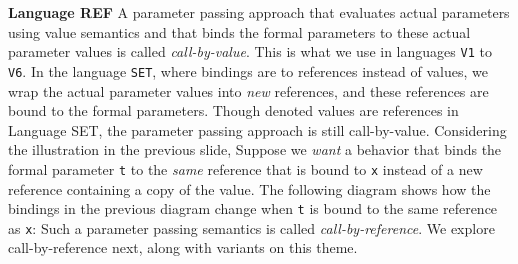 \begin{minipage}[t]{\sw}
\slidenumber
\LARGE
{\bf Language REF}\exx
A parameter passing approach
that evaluates actual parameters using value semantics
and that binds the formal parameters
to these actual parameter values
is called {\em call-by-value}.
This is what we use in languages \verb'V1' to \verb'V6'.\exx
In the language \verb'SET',
where bindings are to references instead of values,
we wrap the actual parameter values
into {\em new} references,
and these references are bound to the formal parameters.
Though denoted values are references in Language SET,
the parameter passing approach is still call-by-value.\exx
Considering the illustration in the previous slide,
Suppose we {\em want} a behavior
that binds the formal parameter \verb't'
to the {\em same} reference that is bound to \verb'x'
instead of a new reference containing a copy of the value.
The following diagram shows how the bindings
in the previous diagram change
when \verb't' is bound to the same reference as \verb'x':
Such a parameter passing semantics is called
{\em call-by-reference}.
We explore call-by-reference next,
along with variants on this theme.
\end{minipage}
\clearpage
